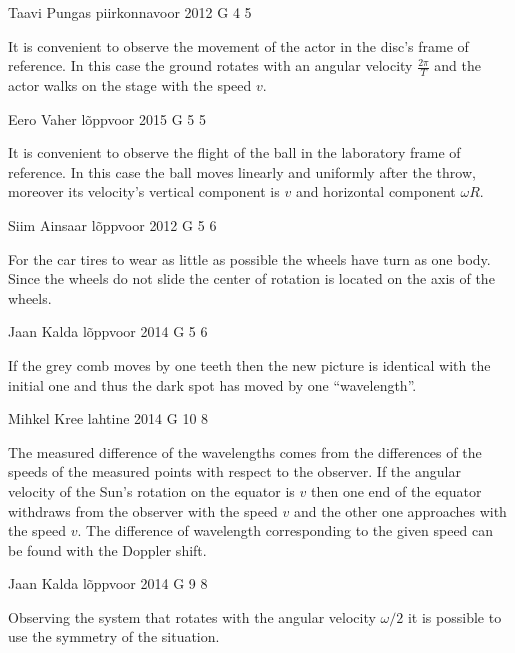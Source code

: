 \documentclass[11pt]{article}
\begin{document}
{Taavi Pungas} %
{piirkonnavoor} %
{2012} %
{G 4} %
{5} %
{

\ifEngHint
It is convenient to observe the movement of the actor in the disc’s frame of reference. In this case the ground rotates with an angular velocity $\frac{2\pi}{T}$ and the actor walks on the stage with the speed $v$.
\fi
}

{Eero Vaher} %
{lõppvoor} %
{2015} %
{G 5} %
{5} %
{

\ifEngHint
It is convenient to observe the flight of the ball in the laboratory frame of reference. In this case the ball moves linearly and uniformly after the throw, moreover its velocity’s vertical component is $v$ and horizontal component $\omega R$.
\fi
}

{Siim Ainsaar} %
{lõppvoor} %
{2012} %
{G 5} %
{6} %
{

\ifEngHint
For the car tires to wear as little as possible the wheels have turn as one body. Since the wheels do not slide the center of rotation is located on the axis of the wheels.
\fi
}

{Jaan Kalda} %
{lõppvoor} %
{2014} %
{G 5} %
{6} %
{

\ifEngHint
If the grey comb moves by one teeth then the new picture is identical with the initial one and thus the dark spot has moved by one “wavelength”.
\fi
}

{Mihkel Kree} %
{lahtine} %
{2014} %
{G 10} %
{8} %
{

\ifEngHint
The measured difference of the wavelengths comes from the differences of the speeds of the measured points with respect to the observer. If the angular velocity of the Sun’s rotation on the equator is $v$ then one end of the equator withdraws from the observer with the speed $v$ and the other one approaches with the speed $v$. The difference of wavelength corresponding to the given speed can be found with the Doppler shift.
\fi
}

{Jaan Kalda} %
{lõppvoor} %
{2014} %
{G 9} %
{8} %
{

\ifEngHint
Observing the system that rotates with the angular velocity $\omega/2$ it is possible to use the symmetry of the situation.
\fi
}
\end{document}
